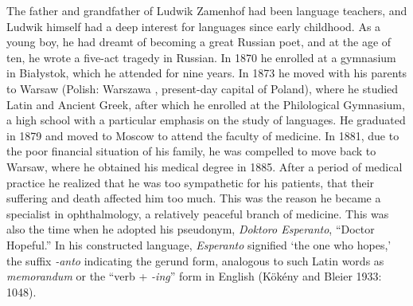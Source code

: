 The father and grandfather of Ludwik Zamenhof had been language teachers, and Ludwik himself had a deep interest for languages since early childhood.
As a young boy, he had dreamt of becoming a great Russian poet, and at the age of ten, he wrote a five-act tragedy in Russian.
In 1870 he enrolled at a gymnasium in Białystok, which he attended for nine years.
In 1873 he moved with his parents to Warsaw (Polish: Warszawa \ipa{[varˈʂava]}, present-day capital of Poland), where he studied Latin and Ancient Greek, after which he enrolled at the Philological Gymnasium, a high school with a particular emphasis on the study of languages.
He graduated in 1879 and moved to Moscow to attend the faculty of medicine.
In 1881, due to the poor financial situation of his family, he was compelled to move back to Warsaw, where he obtained his medical degree in 1885.
After a period of medical practice he realized that he was too sympathetic for his patients, that their suffering and death affected him too much.
This was the reason he became a specialist in ophthalmology, a relatively peaceful branch of medicine.
This was also the time when he adopted his pseudonym, \textit{Doktoro Esperanto}, ``Doctor Hopeful.''
In his constructed language, \textit{Esperanto} signified `the one who hopes,'
the suffix \textit{-anto} indicating the gerund form, analogous to such Latin words as \textit{memorandum} or the ``verb + \textit{-ing}'' form in English
(Kökény and Bleier 1933: 1048).

